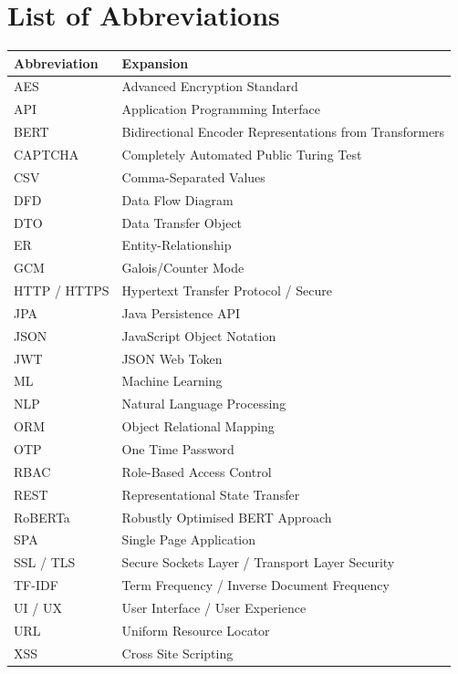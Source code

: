 \documentclass[12pt,a4paper,oneside]{report}
\newif\ifreferencepage
\newif\ifabbreviationpage
\begin{document}
\referencepagefalse
\abbreviationpagetrue
\clearpage
\chapter*{List of Abbreviations}
\thispagestyle{abbreviationfancy}
\pagestyle{abbreviationfancy}

\begin{longtable}{p{} p{}}
\toprule
\textbf{Abbreviation} & \textbf{Expansion} \\
\midrule
\endhead
AES & Advanced Encryption Standard \\
API & Application Programming Interface \\
BERT & Bidirectional Encoder Representations from Transformers \\
CAPTCHA & Completely Automated Public Turing Test \\
CSV & Comma-Separated Values \\
DFD & Data Flow Diagram \\
DTO & Data Transfer Object \\
ER & Entity-Relationship \\
GCM & Galois/Counter Mode \\
HTTP / HTTPS & Hypertext Transfer Protocol / Secure \\
JPA & Java Persistence API \\
JSON & JavaScript Object Notation \\
JWT & JSON Web Token \\
ML & Machine Learning \\
NLP & Natural Language Processing \\
ORM & Object Relational Mapping \\
OTP & One Time Password \\
RBAC & Role-Based Access Control \\
REST & Representational State Transfer \\
RoBERTa & Robustly Optimised BERT Approach \\
SPA & Single Page Application \\
SSL / TLS & Secure Sockets Layer / Transport Layer Security \\
TF-IDF & Term Frequency / Inverse Document Frequency \\
UI / UX & User Interface / User Experience \\
URL & Uniform Resource Locator \\
XSS & Cross Site Scripting \\
\bottomrule
\end{longtable}
\end{document}

